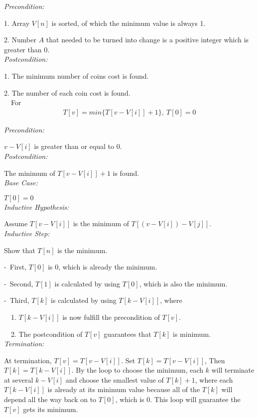 \documentclass[11pt]{scrreprt}
\begin{document}
\emph{Precondition:}

1. Array $V[n]$ is sorted, of which the minimum value is always 1.
 
2. Number $A$ that needed to be turned into change is a positive integer which is greater than 0.\\

\emph{Postcondition:}

1. The minimum number of coins cost is found.

2. The number of each coin cost is found.\\

\ \ For
\begin{eqnarray*}
T[v] = min\{T[v - V[i]] + 1\},\ T[0] = 0
\end{eqnarray*}

\emph{Precondition:}

$v - V[i]$ is greater than or equal to 0.\\

\emph{Postcondition:}

The minimum of $T[v - V[i]] + 1$ is found.\\

\emph{Base Case:}

$T[0] = 0$\\

\emph{Inductive Hypothesis:}

Assume $T[v - V[i]]$ is the minimum of $T[(v - V[i]) - V[j]]$.\\

\emph{Inductive Step:}

Show that $T[n]$ is the minimum.

-\ First, $T[0]$ is 0, which is already the minimum.

-\ Second, $T[1]$ is calculated by using $T[0]$, which is also the minimum.

-\ Third, $T[k]$ is calculated by using $T[k - V[i]]$, where

\ \ 1. $T[k - V[i]]$ is now fulfill the precondition of $T[v]$.

\ \ 2. The postcondition of $T[v]$ guarantees that $T[k]$ is minimum.\\

\emph{Termination:}

At termination, $T[v] = T [v - V[i]]$. Set $T[k] = T[v - V[i]]$, Then $T[k] = T[k - V[i]]$. By the loop to choose the minimum, each $k$ will terminate at several $k - V[i]$ and choose the smallest value of $T[k] + 1$, where each $T[k - V[i]]$ is already at its minimum value because all of the $T[k]$ will depend all the way back on to $T[0]$, which is 0. This loop will guarantee the $T[v]$ gets its minimum.
\end{document}
